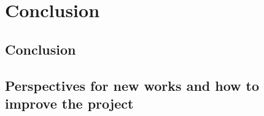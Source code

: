 
\chapter{Conclusion}
\label{ch:Conclusion} 

\section{Conclusion}

\section{Perspectives for new works and how to improve the project}
